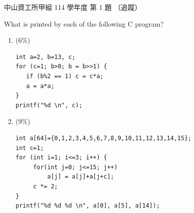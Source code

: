 \begin{pastexam}[label={px:nsysu-114-osds-01}]{中山資工所甲組 114 學年度 第 1 題}
（追蹤）

What is printed by each of the following C program?
\begin{enumerate}[label=(\alph*)]
\item (6\%)
\begin{verbatim}
int a=2, b=13, c;
for (c=1; b>0; b = b>>1) {
   if (b%2 == 1) c = c*a;
   a = a*a;
}
printf("%d \n", c);
\end{verbatim}
\item (9\%)
\begin{verbatim}
int a[64]={0,1,2,3,4,5,6,7,8,9,10,11,12,13,14,15};
int c=1;
for (int i=1; i<=3; i++) {
     for(int j=0; j<=15; j++)
         a[j] = a[j]+a[j+c];
     c *= 2;
}
printf("%d %d %d \n", a[0], a[5], a[14]);
\end{verbatim}
\end{enumerate}
\end{pastexam}

